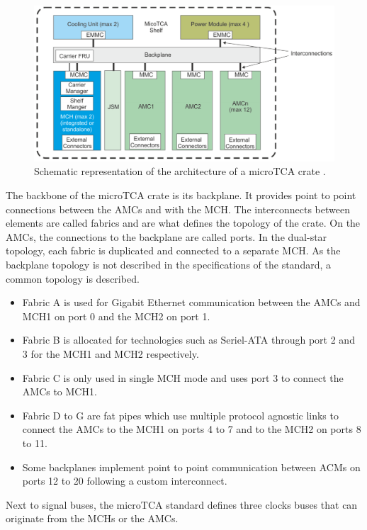       \begin{figure}[h!]
        \centering
        \includegraphics[width=\textwidth]{img/II-2-daq/utca-crate.png}
        \caption{Schematic representation of the architecture of a microTCA crate \cite{VADATECH}.}
        \label{fig:II-2-utca-crate}
      \end{figure}

      The backbone of the microTCA crate is its backplane. It provides point to point connections between the AMCs and with the MCH. The interconnects between elements are called fabrics and are what defines the topology of the crate. On the AMCs, the connections to the backplane are called ports. In the dual-star topology, each fabric is duplicated and connected to a separate MCH. As the backplane topology is not described in the specifications of the standard, a common topology is described.
      \begin{itemize}
        \item Fabric A is used for Gigabit Ethernet communication between the AMCs and MCH1 on port 0 and the MCH2 on port 1.
        \item Fabric B is allocated for technologies such as Seriel-ATA through port 2 and 3 for the MCH1 and MCH2 respectively.
        \item Fabric C is only used in single MCH mode and uses port 3 to connect the AMCs to MCH1.
        \item Fabric D to G are fat pipes which use multiple protocol agnostic links to connect the AMCs to the MCH1 on ports 4 to 7 and to the MCH2 on ports 8 to 11.
        \item Some backplanes implement point to point communication between ACMs on ports 12 to 20 following a custom interconnect.
      \end{itemize}
      Next to signal buses, the microTCA standard defines three clocks buses that can originate from the MCHs or the AMCs.

